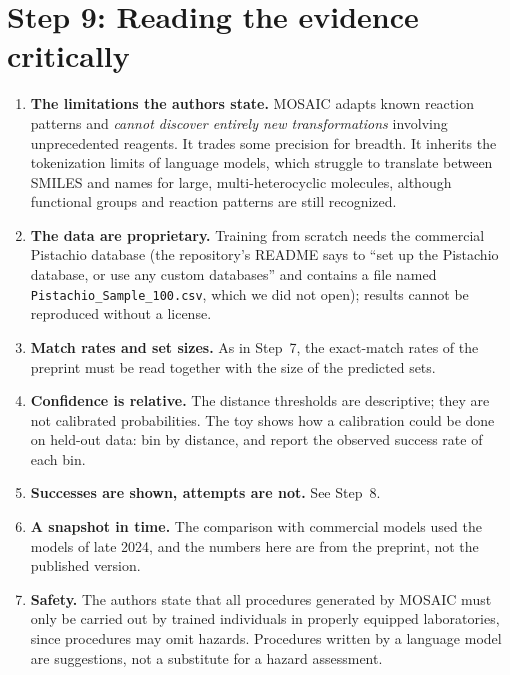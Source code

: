 \documentclass[11pt]{article}
\begin{document}
\section{Step 9: Reading the evidence critically}
\sloppy
\begin{enumerate}[nosep]
  \item \textbf{The limitations the authors state.} MOSAIC adapts known reaction patterns and \emph{cannot discover entirely new transformations} involving unprecedented reagents. It trades some precision for breadth. It inherits the tokenization limits of language models, which struggle to translate between SMILES and names for large, multi-heterocyclic molecules, although functional groups and reaction patterns are still recognized.
  \item \textbf{The data are proprietary.} Training from scratch needs the commercial Pistachio database (the repository's README says to ``set up the Pistachio database, or use any custom databases'' and contains a file named \texttt{Pistachio\_Sample\_100.csv}, which we did not open); results cannot be reproduced without a license.
  \item \textbf{Match rates and set sizes.} As in Step~7, the exact-match rates of the preprint must be read together with the size of the predicted sets.
  \item \textbf{Confidence is relative.} The distance thresholds are descriptive; they are not calibrated probabilities. The toy shows how a calibration could be done on held-out data: bin by distance, and report the observed success rate of each bin.
  \item \textbf{Successes are shown, attempts are not.} See Step~8.
  \item \textbf{A snapshot in time.} The comparison with commercial models used the models of late 2024, and the numbers here are from the preprint, not the published version.
  \item \textbf{Safety.} The authors state that all procedures generated by MOSAIC must only be carried out by trained individuals in properly equipped laboratories, since procedures may omit hazards. Procedures written by a language model are suggestions, not a substitute for a hazard assessment.
\end{enumerate}

\end{document}
